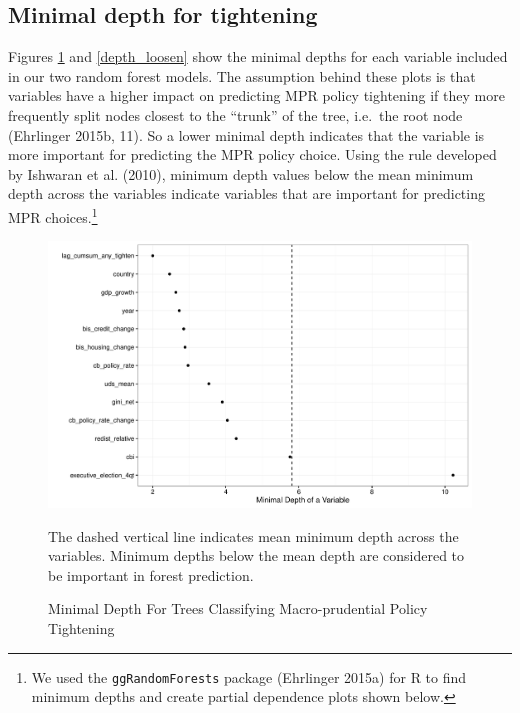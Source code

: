 \documentclass[]{article}
\let\rmarkdownfootnote\footnote%
\def\footnote{\protect\rmarkdownfootnote}
\begin{document}




\begin{landscape}
    
\end{landscape}

\subsection{Minimal depth for
tightening}\label{minimal-depth-for-tightening}

Figures \ref{depth_tighten} and \ref{depth_loosen} show the minimal
depths for each variable included in our two random forest models. The
assumption behind these plots is that variables have a higher impact on
predicting MPR policy tightening if they more frequently split nodes
closest to the ``trunk'' of the tree, i.e.~the root node (Ehrlinger
2015b, 11). So a lower minimal depth indicates that the variable is more
important for predicting the MPR policy choice. Using the rule developed
by Ishwaran et al. (2010), minimum depth values below the mean minimum
depth across the variables indicate variables that are important for
predicting MPR choices.\footnote{We used the \texttt{ggRandomForests}
  package (Ehrlinger 2015a) for R to find minimum depths and create
  partial dependence plots shown below.}

\begin{figure}
    \caption{Minimal Depth For Trees Classifying Macro-prudential Policy Tightening}
    \label{depth_tighten}
    \begin{center}
        \includegraphics{figures/tighten_md.pdf}
    \end{center}

    {\scriptsize{The dashed vertical line indicates mean minimum depth across the variables. Minimum depths below the mean depth are considered to be important in forest prediction.}}

\end{figure}
\end{document}
